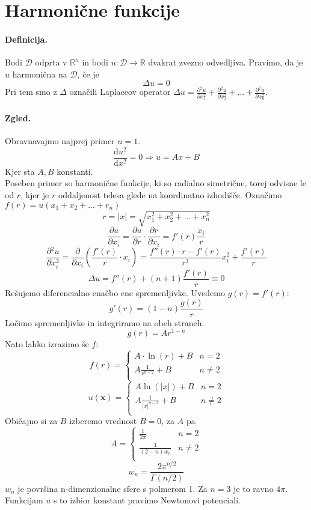 \documentclass[a4paper]{article}
\newcommand{\pd}[2]{\frac{\partial {#1}}{\partial {#2}}}
\newcommand{\dd}[2]{\frac{\mathrm{d} {#1}}{\mathrm{d} {#2}}}
\newcommand{\R}{\mathbb{R}}
\newcommand{\fn}[3]{{#1}\colon {#2} \rightarrow {#3}}
\begin{document}
\section{Harmonične funkcije}
\paragraph{Definicija.} Bodi $\mathcal{D}$ odprta v $\R^n$ in bodi $\fn{u}{\mathcal{D}}{\R}$ dvakrat zvezno odvedljiva.
Pravimo, da je $u$ harmonična na $\mathcal{D}$, če je
$$\Delta u = 0$$
Pri tem smo z $\Delta$ označili Laplaceov operator $\displaystyle{\Delta u = \pd{^2u}{x_1^2}} + \pd{^2u}{x_2^2} + ... + \pd{^2u}{x_n^2}$.
\paragraph{Zgled.} Obravnavajmo najprej primer $n=1$.
$$\dd{u^2}{x^2} = 0 \Rightarrow u = Ax + B$$
Kjer sta $A, B$ konstanti. \\[3mm]
Poseben primer so harmonične funkcije, ki so radialno simetrične, torej odvisne le od $r$, kjer je $r$ oddaljenost telesa glede na koordinatno izhodišče. Označimo $f(r) = u(x_1 + x_2 + ... + r_n)$
$$r = |x| = \sqrt{x_1^2 + x_2^2 + ... + x_n^2}$$
$$\pd{u}{x_i} = \pd{u}{r} \cdot \pd{r}{x_i} = f'(r) \frac{x_i}{r}$$
$$\pd{^2u}{x_i^2} = \pd{}{x_i}\left(\frac{f'(r)}{r}\cdot x_i\right) = \frac{f''(r)\cdot r - f'(r)}{r^3} x_i^2 + \frac{f'(r)}{r}$$
$$\Delta u = f''(r) + (n+1)\frac{f'(r)}{r} \equiv 0$$
Rešujemo diferencialno enačbo ene spremenljivke. Uvedemo $g(r) = f'(r)$:
$$g'(r) = (1-n)\frac{g(r)}{r}$$
Ločimo spremenljivke in integriramo na obeh straneh.
$$g(r) = Ar^{1-n}$$
Nato lahko izrazimo še $f$:
$$f(r) = \begin{cases}
    A\cdot\ln(r) + B & n = 2 \\
    A \frac{1}{r^{n-2}} + B & n \neq 2 \\
\end{cases}$$
$$u(\mathbf{x}) = \begin{cases}
    A \ln(|x|) + B & n = 2 \\
    A \frac{1}{|x|^{n-2}} + B & n \neq 2 \\
\end{cases}$$
Običajno si za $B$ izberemo vrednost $B=0$, za $A$ pa
$$A = \begin{cases}
    \frac{1}{2\pi} & n = 2 \\
    \frac{1}{(2-n)w_n} & n \neq 2 \\
\end{cases}$$
$$w_n = \frac{2\pi^{n/2}}{\Gamma(n/2)}$$
$w_n$ je površina n-dimenzionalne sfere s polmerom 1. Za $n=3$ je to ravno $4\pi$.
Funkcijam $u$ s to izbior konstant pravimo Newtonovi potenciali.
\end{document}
